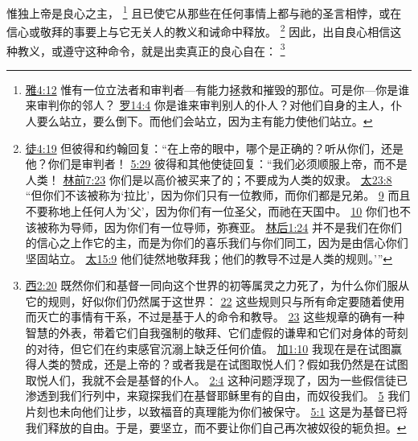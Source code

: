 \documentclass[12pt, a4paper, oneside]{ctexart}
\newcounter{parnum}[section]
\newcommand{\N}{%
   \noindent\refstepcounter{parnum}%
    \makebox[\parindent][l]{\textbf{\arabic{parnum}.}}}
\begin{document}
\N 惟独上帝是良心之主，
	\footnote {
		\href{https://biblehub.com/james/4-12.htm}{雅4:12} 惟有一位立法者和审判者---有能力拯救和摧毁的那位。可是你---你是谁来审判你的邻人？
		\href{https://biblehub.com/romans/14-4.htm}{罗14:4} 你是谁来审判别人的仆人？对他们自身的主人，仆人要么站立，要么倒下。而他们会站立，因为主有能力使他们站立。
	}
	且已使它从那些在任何事情上都与祂的圣言相悖，或在信心或敬拜的事要上与它无关人的教义和诫命中释放。
	\footnote {
		\href{https://biblehub.com/acts/4-19.htm}{徒4:19} 但彼得和约翰回复：“在上帝的眼中，哪个是正确的？听从你们，还是他？你们是审判者！
		\href{https://biblehub.com/acts/5-29.htm}{5:29} 彼得和其他使徒回复：“我们必须顺服上帝，而不是人类！ 
        \href{https://biblehub.com/1_corinthians/7-23.htm}{林前7:23} 你们是以高价被买来了的；不要成为人类的奴隶。
		\href{https://biblehub.com/matthew/23-8.htm}{太23:8} “但你们不该被称为‘拉比’，因为你们只有一位教师，而你们都是兄弟。
		\href{https://biblehub.com/matthew/23-9.htm}{9} 而且不要称地上任何人为'父'，因为你们有一位圣父，而祂在天国中。
		\href{https://biblehub.com/matthew/23-10.htm}{10} 你们也不该被称为导师，因为你们有一位导师，弥赛亚。
		\href{https://biblehub.com/2_corinthians/1-24.htm}{林后1:24} 并不是我们在你们的信心之上作它的主，而是为你们的喜乐我们与你们同工，因为是由信心你们坚固站立。
		\href{https://biblehub.com/matthew/15-9.htm}{太15:9} 他们徒然地敬拜我；他们的教导不过是人类的规则。’”
	}
	因此，出自良心相信这种教义，或遵守这种命令，就是出卖真正的良心自在：
	\footnote {
		\href{https://biblehub.com/colossians/2-20.htm}{西2:20} 既然你们和基督一同向这个世界的初等属灵之力死了，为什么你们服从它的规则，好似你们仍然属于这世界：
		\href{https://biblehub.com/colossians/2-22.htm}{22} 这些规则只与所有命定要随着使用而灭亡的事情有干系，不过是基于人的命令和教导。
		\href{https://biblehub.com/colossians/2-23.htm}{23} 这些规章的确有一种智慧的外表，带着它们自我强制的敬拜、它们虚假的谦卑和它们对身体的苛刻的对待，但它们在约束感官沉溺上缺乏任何价值。
		\href{https://biblehub.com/galatians/1-10.htm}{加1:10} 我现在是在试图赢得人类的赞成，还是上帝的？或者我是在试图取悦人们？假如我仍然是在试图取悦人们，我就不会是基督的仆人。
		\href{https://biblehub.com/galatians/2-4.htm}{2:4} 这种问题浮现了，因为一些假信徒已渗透到我们行列中，来窥探我们在基督耶稣里有的自由，而奴役我们。
		\href{https://biblehub.com/galatians/2-5.htm}{5} 我们片刻也未向他们让步，以致福音的真理能为你们被保守。
		\href{https://biblehub.com/galatians/5-1.htm}{5:1} 这是为基督已将我们释放的自由。于是，要坚立，而不要让你们自己再次被奴役的轭负担。
	}
\end{document}
